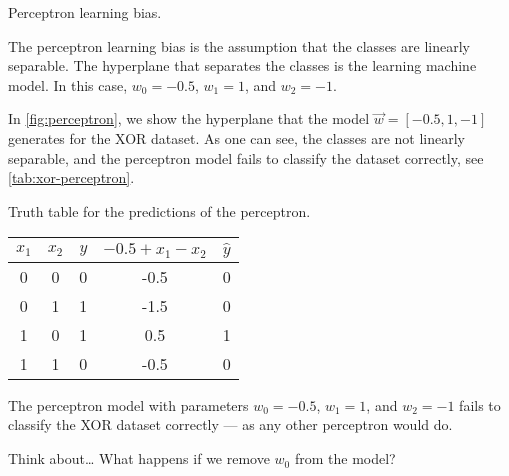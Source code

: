 \begin{figurebox}[label=fig:perceptron]{Perceptron learning bias.}
  \centering
  \tcblower
  The perceptron learning bias is the assumption that the classes are linearly separable.
  The hyperplane that separates the classes is the learning machine model.
  In this case, $w_0 = -0.5$, $w_1 = 1$, and $w_2 = -1$.
\end{figurebox}

In \cref{fig:perceptron}, we show the hyperplane that the model $\vec{w} = [-0.5, 1, -1]$
generates for the XOR dataset.  As one can see, the classes are not linearly separable,
and the perceptron model fails to classify the dataset correctly, see \cref{tab:xor-perceptron}.

\begin{tablebox}[label=tab:xor-perceptron]{Truth table for the predictions of the perceptron.}
  \centering
  \begin{tabular}{ccc|cc}
    \toprule
    $x_1$ & $x_2$ & $y$ & $-0.5 + x_1 - x_2$ & $\hat{y}$ \\
    \midrule
    0 & 0 & 0 & -0.5 & 0 \\
    0 & 1 & 1 & -1.5 & 0 \\
    1 & 0 & 1 & 0.5 & 1 \\
    1 & 1 & 0 & -0.5 & 0 \\
    \bottomrule
  \end{tabular}
  \tcblower
  The perceptron model with parameters $w_0 = -0.5$, $w_1 = 1$, and $w_2 = -1$
  fails to classify the XOR dataset correctly --- as any other perceptron would do.
\end{tablebox}

\begin{mainbox}{Think about\dots}
  What happens if we remove $w_0$ from the model?
\end{mainbox}

